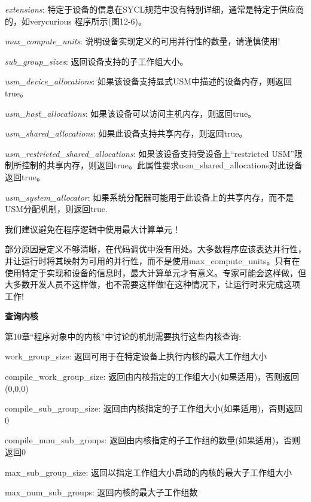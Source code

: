 \textit{extensions}: 特定于设备的信息在SYCL规范中没有特别详细，通常是特定于供应商的，如verycurious 程序所示(图12-6)。\par

\textit{max\_compute\_units}: 说明设备实现定义的可用并行性的数量，请谨慎使用!\par

\textit{sub\_group\_sizes}: 返回设备支持的子工作组大小。\par

\textit{usm\_device\_allocations}: 如果该设备支持显式USM中描述的设备内存，则返回true。\par

\textit{usm\_host\_allocations}: 如果该设备可以访问主机内存，则返回true。\par

\textit{usm\_shared\_allocations}: 如果此设备支持共享内存，则返回true。\par

\textit{usm\_restricted\_shared\_allocations}: 如果该设备支持受设备上“restricted USM”限制所控制的共享内存，则返回true。此属性要求usm\_shared\_allocations对此设备返回true。\par

\textit{usm\_system\_allocator}: 如果系统分配器可能用于此设备上的共享内存，而不是USM分配机制，则返回true.\par

\begin{tcolorbox}[colback=red!5!white,colframe=red!75!black]
我们建议避免在程序逻辑中使用最大计算单元！
\end{tcolorbox}

部分原因是定义不够清晰，在代码调优中没有用处。大多数程序应该表达并行性，并让运行时将其映射为可用的并行性，而不是使用max\_compute\_units。只有在使用特定于实现和设备的信息时，最大计算单元才有意义。专家可能会这样做，但大多数开发人员不这样做，也不需要这样做!在这种情况下，让运行时来完成这项工作!\par

\hspace*{\fill} \par %
\textbf{查询内核}

第10章“程序对象中的内核”中讨论的机制需要执行这些内核查询:\par

work\_group\_size: 返回可用于在特定设备上执行内核的最大工作组大小\par

compile\_work\_group\_size: 返回由内核指定的工作组大小(如果适用)，否则返回(0,0,0)\par

compile\_sub\_group\_size: 返回由内核指定的子工作组大小(如果适用)，否则返回0\par

compile\_num\_sub\_groups: 返回由内核指定的子工作组的数量(如果适用)，否则返回0\par

max\_sub\_group\_size: 返回以指定工作组大小启动的内核的最大子工作组大小\par

max\_num\_sub\_groups: 返回内核的最大子工作组数\par











